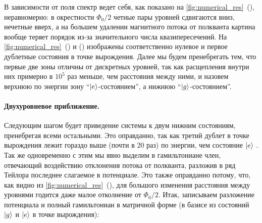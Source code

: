 \documentclass[12pt]{article}
\DeclarePairedDelimiter\ket{\lvert}{\rangle}
\numberwithin{equation}{section}
\begin{document}
В зависимости от поля спектр ведет себя, как показано на \autoref{fig:numerical_res}~(), неравномерно: в окрестности $\Phi_0/2$ четные пары уровней сдвигаются вниз, нечетные вверх, а на большем удалении магнитного потока от полкванта картина вообще теряет порядок из-за значительного числа квазипересечений. На \autoref{fig:numerical_res}~() и () изображены соответственно нулевое и первое дублетные состояния в точке вырождения.  Далее мы будем пренебрегать тем, что первые две зоны отличны от дискретных уровней, так как расщепления внутри них примерно в $10^5$ раз меньше, чем расстояния между ними, и назовем верхнюю по энергии зону ``$\ket{e}$-состоянием'', а нижнюю ``$\ket{g}$-состоянием''.

\paragraph{Двухуровневое приближение.} Следующим шагом будет приведение системы к двум нижним состояниям, пренебрегая всеми остальными. Это оправданно, так как третий дублет в точке вырождения лежит гораздо выше (почти в 20 раз) по энергии, чем состояние $\ket{e}$ . Так же одновременно с этим мы явно выделим в гамильтониане член, отвечающий воздействию отклонения потока от полкванта, разложив в ряд Тейлора последнее слагаемое в потенциале. Это также оправданно потому, что, как видно из \autoref{fig:numerical_res}~(), для большого изменения расстояния между уровнями годится даже малое отколнение от $\Phi_0/2$. Итак, записываем разложение потенциала и полный гамильтониан в матричной форме (в базисе из состояний $\ket{g}$ и $\ket{e}$ в точке вырождения):
\end{document}
